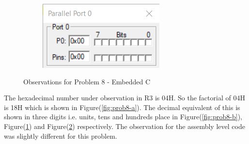 \documentclass{lab_sheet}
\begin{document}
\begin{figure}[H]
\begin{subfigure}{.5\textwidth}
  \caption{}
  \label{fig:prob8-c}
\end{subfigure}
\begin{subfigure}{.5\textwidth}
  \centering
  \includegraphics[frame,width=.8\linewidth]{../Figures/1_8_d.png}   
  \caption{}
  \label{fig:prob8-d}
\end{subfigure}
\caption{Observations for Problem 8 - Embedded C}
\label{fig:prob8}
\end{figure}
The hexadecimal number under observation in R3 is 04H. So the factorial of 04H is 18H which is shown in Figure(\ref{fig:prob8-a}). The decimal equivalent of this is shown in three digits i.e. units, tens and hundreds place in Figure(\ref{fig:prob8-b}), Figure(\ref{fig:prob8-c}) and Figure(\ref{fig:prob8-d}) respectively. The observation for the assembly level code was slightly different for this problem.
\end{document}
